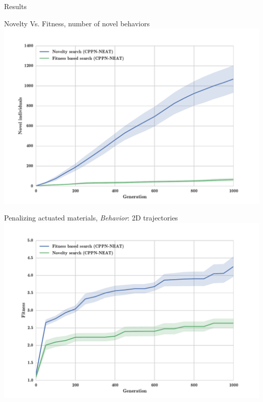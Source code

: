 \documentclass{beamer}
\begin{document}
\begin{frame}[allowframebreaks]{Results}
\begin{minipage}{\textwidth}
\begin{block}{Novelty Vs. Fitness, number of novel behaviors}
\includegraphics[width=1.0\textwidth]{../Figures/Results/novelIndividualsFitNovComp.pdf}
\end{block}
\end{minipage}

\begin{minipage}{\textwidth}
\begin{block}{Penalizing actuated materials, \textit{Behavior}: 2D trajectories}
\includegraphics[width=1.0\textwidth]{../Figures/Results/FitNovSize5Pen2.pdf}
\end{block}
\end{minipage}


\end{frame}
\end{document}
